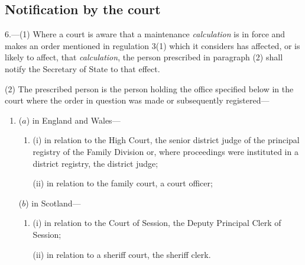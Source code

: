 \documentclass[12pt,a4paper]{article}
\begin{document}
\subsection[6. Notification by the court]{Notification by the court}

6.—(1) Where a court is aware that a maintenance 
\emph{calculation} 
is in force and makes an order mentioned in regulation 3(1) which it considers has affected, or is likely to affect, that 
\emph{calculation}, 
the person prescribed in paragraph (2) shall notify the Secretary of State to that effect.

(2) The prescribed person is the person holding the office specified below in the court where the order in question was made or subsequently registered—
\begin{enumerate}\item[]
($a$) in England and Wales—
\begin{enumerate}\item[]
(i) in relation to the High Court, the senior district judge of the principal registry of the Family Division or, where proceedings were instituted in a district registry, the district judge;

%

(ii) in relation to the family court, a court officer;
\end{enumerate}

($b$) in Scotland—
\begin{enumerate}\item[]
(i) in relation to the Court of Session, the Deputy Principal Clerk of Session;

(ii) in relation to a sheriff court, the sheriff clerk.
\end{enumerate}
\end{enumerate}

\end{document}
